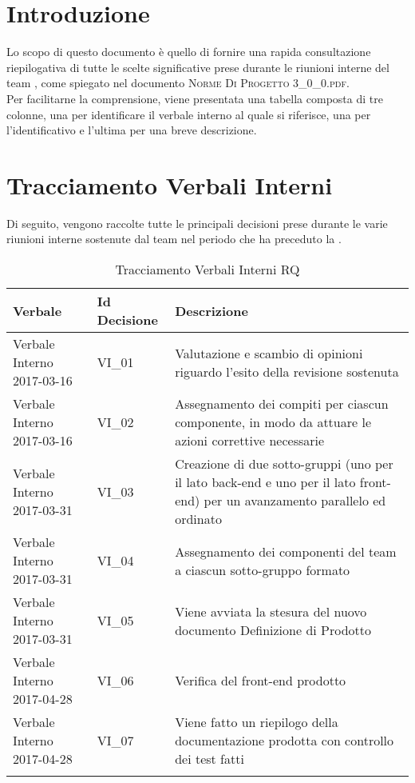 \section{Introduzione}
Lo scopo di questo documento è quello di fornire una rapida consultazione riepilogativa di tutte le scelte significative prese durante le riunioni interne del team \gruppo, come spiegato nel documento \textsc{Norme Di Progetto 3\_0\_0.pdf}.\\
Per facilitarne la comprensione, viene presentata una tabella composta di tre colonne, una per identificare il verbale interno al quale si riferisce, una per l'identificativo e l'ultima per una breve descrizione.

\section{Tracciamento Verbali Interni}
Di seguito, vengono raccolte tutte le principali decisioni prese durante le varie riunioni interne sostenute dal team nel periodo che ha preceduto la \RQ.

\normalsize
\begin{longtable}{|>{\centering\arraybackslash}p{4.7cm}|>{\centering\arraybackslash}p{2.5cm} | >{\centering\arraybackslash}p{7cm}|}
	\hline \rowcolor{Gray}
	\textbf{Verbale} & \textbf{Id Decisione} & \textbf{Descrizione}\\
	\hline
	\endhead
			Verbale Interno 2017-03-16 & VI\_01	&  Valutazione e scambio di opinioni riguardo l'esito della revisione sostenuta \\
			\hline
			Verbale Interno 2017-03-16 & VI\_02 &  Assegnamento dei compiti per ciascun componente, in modo da attuare le azioni correttive necessarie \\
			\hline
			Verbale Interno 2017-03-31 & VI\_03	& Creazione di due sotto-gruppi (uno per il lato back-end e uno per il lato front-end) per un avanzamento parallelo ed ordinato	\\
			\hline
			Verbale Interno 2017-03-31 & VI\_04 & Assegnamento dei componenti del team a ciascun sotto-gruppo formato \\
			\hline
			Verbale Interno 2017-03-31 & VI\_05 & Viene avviata la stesura del nuovo documento Definizione di Prodotto \\
			\hline
			Verbale Interno 2017-04-28 & VI\_06	&  Verifica del front-end prodotto \\
			\hline
			Verbale Interno 2017-04-28 & VI\_07 &  Viene fatto un riepilogo della documentazione prodotta con controllo dei test fatti \\
			\hline
		\caption{Tracciamento Verbali Interni RQ}
\end{longtable}